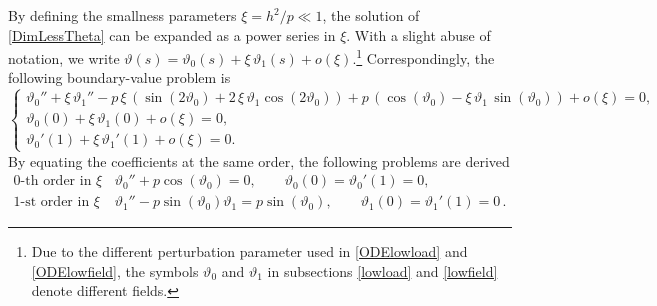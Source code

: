 \documentclass[oneside]{article}
\begin{document}
			By defining the smallness parameters $\xi=h^2/p\ll 1$, the solution of \eqref{DimLessTheta} can be expanded as a power series in $\xi$.  With a slight abuse of notation, we write $\vartheta(s) = \vartheta_0(s)+\xi\,\vartheta_1(s)+o(\xi)$.\footnote{Due to the different perturbation parameter used in \eqref{ODElowload} and \eqref{ODElowfield}, the symbols $\vartheta_0$ and $\vartheta_1$  in subsections \ref{lowload} and \ref{lowfield} denote different fields.} Correspondingly, the following boundary-value problem is 
			\begin{equation}
			\begin{cases}
			\vartheta_0''+\xi\, \vartheta_1'' - p\, \xi\, (\sin(2\vartheta_0)+2\,\xi\,\vartheta_1\cos(2\vartheta_0)) + p\,(\cos(\vartheta_0)-\xi\,\vartheta_1\,\sin(\vartheta_0))+o(\xi) = 0,\\
			\vartheta_0(0)+\xi\,\vartheta_1(0)+o(\xi)=0,\\
			\vartheta_0'(1)+\xi\,\vartheta_1'(1)+o(\xi)=0.
			\end{cases}
			\label{ODElowfield}
			\end{equation}
			By equating the coefficients at the same order, the following problems are derived
			\begin{align}
			\text{0-th order in $\xi$} \qquad &\vartheta_0'' +p \cos(\vartheta_0) = 0, \qquad \vartheta_0(0)=\vartheta_0'(1)=0, \label{ODE0thbig}\\
			\text{1-st order in $\xi$} \qquad & \vartheta_1'' - p \sin(\vartheta_0) \vartheta_1 = p \sin(\vartheta_0), \qquad \vartheta_1(0)=\vartheta_1'(1)=0\,.
			\label{ODE1stbig}
			\end{align}
			
\end{document}
